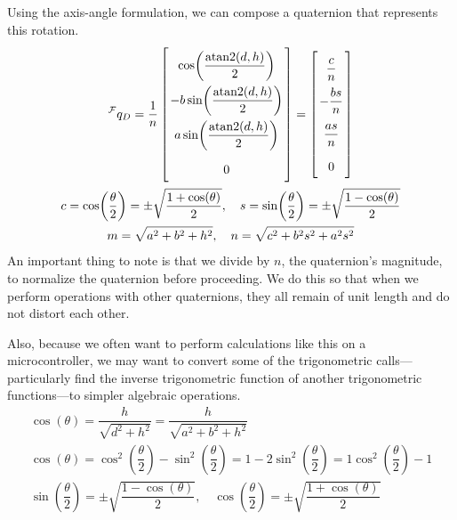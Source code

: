 \documentclass[letterpaper,10pt]{article}
\newcommand\leftidx[3]{%
  {\vphantom{#2}}#1#2#3%
}
\begin{document}
Using the axis-angle formulation, we can compose a quaternion that represents this rotation.
\begin{gather}
\leftidx{^\mathcal{F}}{q}{_{D}} = \dfrac{1}{n} \left[\arraycolsep=1.4pt\def\arraystretch{2.2}\begin{array}{c} \cos\!\left(\dfrac{\mathrm{atan2}\!\left(d,h\right)}{2}\right) \\ -b \sin\!\left(\dfrac{\mathrm{atan2}\!\left(d,h\right)}{2}\right) \\ a \sin\!\left(\dfrac{\mathrm{atan2}\!\left(d,h\right)}{2}\right) \\ 0\end{array} \right] = \left[\arraycolsep=1.4pt\def\arraystretch{2.2}\begin{array}{c} \dfrac{c}{n} \\ -\dfrac{bs}{n} \\ \dfrac{as}{n} \\ 0 \end{array}\right] \\ 
\nonumber c= \cos\!\left(\dfrac{\theta}{2}\right) = \pm \sqrt{\dfrac{1+\cos\!\left(\theta \right)}{2}}, \quad s=\sin\!\left(\dfrac{\theta}{2}\right) = \pm \sqrt{\dfrac{1-\cos\!\left(\theta\right)}{2}}\\
\nonumber m = \sqrt{a^2 + b^2 + h^2}, \quad n = \sqrt{c^2+b^2s^2+a^2s^2}
\end{gather}
An important thing to note is that we divide by $n$, the quaternion's magnitude, to normalize the quaternion before proceeding. We do this so that when we perform operations with other quaternions, they all remain of unit length and do not distort each other.

Also, because we often want to perform calculations like this on a microcontroller, we may want to convert some of the trigonometric calls---particularly find the inverse trigonometric function of another trigonometric functions---to simpler algebraic operations.
\begin{gather*}
\cos\!\left(\theta\right) = \dfrac{h}{\sqrt{d^2+h^2}} = \dfrac{h}{\sqrt{a^2+b^2+h^2}} \\
\cos\!\left(\theta\right) = \cos^2\!\left(\dfrac{\theta}{2}\right) - \sin^2\!\left(\dfrac{\theta}{2}\right)  = 1 - 2\sin^2\!\left(\dfrac{\theta}{2}\right) = 1\cos^2\!\left(\dfrac{\theta}{2}\right) - 1\\
\sin\!\left(\dfrac{\theta}{2}\right) = \pm \sqrt{\dfrac{1-\cos\!\left(\theta\right)}{2}}, \quad \cos\!\left(\dfrac{\theta}{2}\right) = \pm \sqrt{\dfrac{1+\cos\!\left(\theta \right)}{2}}
\end{gather*}
\end{document}
